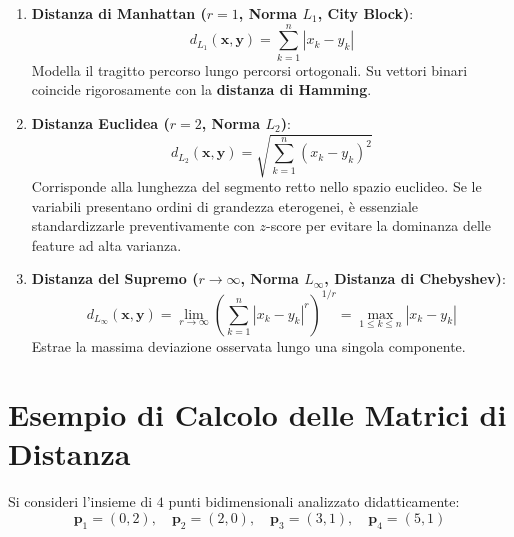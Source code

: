 \begin{enumerate}
    \item \textbf{Distanza di Manhattan ($r = 1$, Norma $L_1$, City Block)}:
    \begin{equation}
        d_{L_1}(\mathbf{x}, \mathbf{y}) = \sum_{k=1}^n |x_k - y_k|
    \end{equation}
    Modella il tragitto percorso lungo percorsi ortogonali. Su vettori binari coincide rigorosamente con la \textbf{distanza di Hamming}.
    \item \textbf{Distanza Euclidea ($r = 2$, Norma $L_2$)}:
    \begin{equation}
        d_{L_2}(\mathbf{x}, \mathbf{y}) = \sqrt{\sum_{k=1}^n (x_k - y_k)^2}
    \end{equation}
    Corrisponde alla lunghezza del segmento retto nello spazio euclideo. Se le variabili presentano ordini di grandezza eterogenei, è essenziale standardizzarle preventivamente con $z$-score per evitare la dominanza delle feature ad alta varianza.
    \item \textbf{Distanza del Supremo ($r \to \infty$, Norma $L_\infty$, Distanza di Chebyshev)}:
    \begin{equation}
        d_{L_\infty}(\mathbf{x}, \mathbf{y}) = \lim_{r \to \infty} \left( \sum_{k=1}^n |x_k - y_k|^r \right)^{1/r} = \max_{1 \le k \le n} |x_k - y_k|
    \end{equation}
    Estrae la massima deviazione osservata lungo una singola componente.
\end{enumerate}

\FloatBarrier
\section{Esempio di Calcolo delle Matrici di Distanza}
\label{sec:dm-distance-matrix-example}

Si consideri l'insieme di $4$ punti bidimensionali analizzato didatticamente:
\begin{equation}
    \mathbf{p}_1 = (0, 2), \quad \mathbf{p}_2 = (2, 0), \quad \mathbf{p}_3 = (3, 1), \quad \mathbf{p}_4 = (5, 1)
\end{equation}

